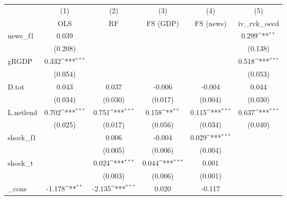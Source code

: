 {
\def\sym#1{\ifmmode^{#1}\else\(^{#1}\)\fi}
\begin{tabular}{l*{5}{c}}
\toprule
            &\multicolumn{1}{c}{(1)}&\multicolumn{1}{c}{(2)}&\multicolumn{1}{c}{(3)}&\multicolumn{1}{c}{(4)}&\multicolumn{1}{c}{(5)}\\
            &\multicolumn{1}{c}{OLS}&\multicolumn{1}{c}{RF}&\multicolumn{1}{c}{FS (GDP)}&\multicolumn{1}{c}{FS (news)}&\multicolumn{1}{c}{iv\_rvk\_oecd}\\
\midrule
news\_f1     &       0.039         &                     &                     &                     &       0.299\sym{**} \\
            &     (0.208)         &                     &                     &                     &     (0.138)         \\
\addlinespace
gRGDP       &       0.332\sym{***}&                     &                     &                     &       0.518\sym{***}\\
            &     (0.054)         &                     &                     &                     &     (0.053)         \\
\addlinespace
D.tot       &       0.043         &       0.037         &      -0.006         &      -0.004         &       0.044         \\
            &     (0.034)         &     (0.030)         &     (0.017)         &     (0.004)         &     (0.030)         \\
\addlinespace
L.netlend   &       0.702\sym{***}&       0.751\sym{***}&       0.158\sym{**} &       0.115\sym{***}&       0.637\sym{***}\\
            &     (0.025)         &     (0.017)         &     (0.056)         &     (0.034)         &     (0.040)         \\
\addlinespace
shock\_f1    &                     &       0.006         &      -0.004         &       0.029\sym{***}&                     \\
            &                     &     (0.005)         &     (0.006)         &     (0.004)         &                     \\
\addlinespace
shock\_t     &                     &       0.024\sym{***}&       0.044\sym{***}&       0.001         &                     \\
            &                     &     (0.003)         &     (0.006)         &     (0.001)         &                     \\
\addlinespace
\_cons      &      -1.178\sym{**} &      -2.135\sym{***}&       0.020         &      -0.117         &                     \\

\end{tabular}}
